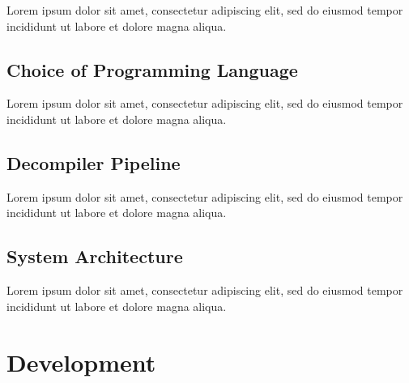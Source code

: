 \documentclass[12pt, a4paper]{article}
\begin{document}
Lorem ipsum dolor sit amet, consectetur adipiscing elit, sed do eiusmod tempor incididunt ut labore et dolore magna aliqua.


\subsection{Choice of Programming Language}


Lorem ipsum dolor sit amet, consectetur adipiscing elit, sed do eiusmod tempor incididunt ut labore et dolore magna aliqua.



\subsection{Decompiler Pipeline}


Lorem ipsum dolor sit amet, consectetur adipiscing elit, sed do eiusmod tempor incididunt ut labore et dolore magna aliqua.


\subsection{System Architecture}


Lorem ipsum dolor sit amet, consectetur adipiscing elit, sed do eiusmod tempor incididunt ut labore et dolore magna aliqua.



\section{Development}
\end{document}
